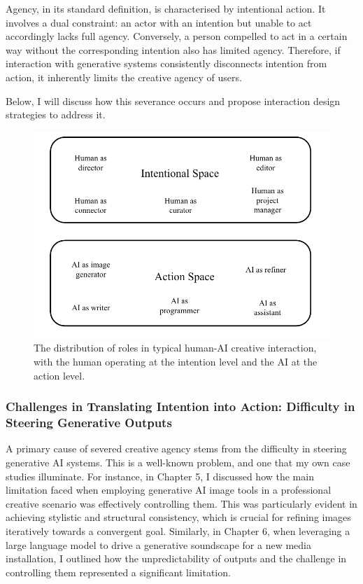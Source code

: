 Agency, in its standard definition, is characterised by intentional action. It involves a dual constraint: an actor with an intention but unable to act accordingly lacks full agency. Conversely, a person compelled to act in a certain way without the corresponding intention also has limited agency. Therefore, if interaction with generative systems consistently disconnects intention from action, it inherently limits the creative agency of users.

Below, I will discuss how this severance occurs and propose interaction design strategies to address it.

\begin{figure}[H]
    \centering
    \includegraphics[width=0.75\linewidth]{roles.png}
    \caption{The distribution of roles in typical human-AI creative interaction, with the human operating at the intention level and the AI at the action level.}
    \label{fig:roles-in-spaces}
\end{figure}

\subsubsection{Challenges in Translating Intention into Action: Difficulty in Steering Generative Outputs}

A primary cause of severed creative agency stems from the difficulty in steering generative AI systems. This is a well-known problem, and one that my own case studies illuminate. For instance, in Chapter 5, I discussed how the main limitation faced when employing generative AI image tools in a professional creative scenario was effectively controlling them. This was particularly evident in achieving stylistic and structural consistency, which is crucial for refining images iteratively towards a convergent goal. Similarly, in Chapter 6, when leveraging a large language model to drive a generative soundscape for a new media installation, I outlined how the unpredictability of outputs and the challenge in controlling them represented a significant limitation.

